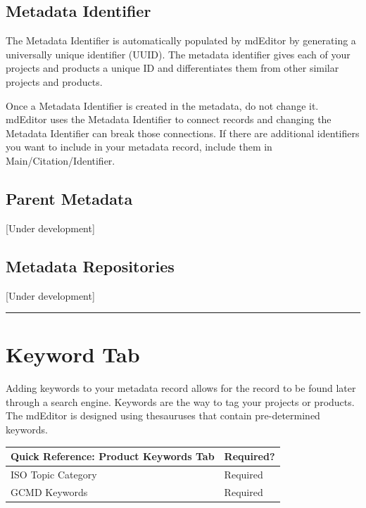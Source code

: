 \documentclass[
]{book}
\makeatletter
\newenvironment{kframe}{%
\medskip{}
\setlength{\fboxsep}{.8em}
 \def\at@end@of@kframe{}%
 \ifinner\ifhmode%
  \def\at@end@of@kframe{\end{minipage}}%
  \begin{minipage}{\columnwidth}%
 \fi\fi%
 \def\FrameCommand##1{\hskip\@totalleftmargin \hskip-\fboxsep
 \colorbox{shadecolor}{##1}\hskip-\fboxsep
     \hskip-\linewidth \hskip-\@totalleftmargin \hskip\columnwidth}%
 \MakeFramed {\advance\hsize-\width
   \@totalleftmargin\z@ \linewidth\hsize
   \@setminipage}}%
 {\par\unskip\endMakeFramed%
 \at@end@of@kframe}
\newenvironment{rmdblock}[1]
  {
  \begin{itemize}
  \renewcommand{\labelitemi}{
    \raisebox{-.7\height}[0pt][0pt]{
      {\setkeys{Gin}{width=3em,keepaspectratio}\texttt{[image: images/\#1]}}
    }
  }
  \setlength{\fboxsep}{1em}
  \begin{kframe}
  \item
  }
  {
  \end{kframe}
  \end{itemize}
  }
\newenvironment{rmdwarning}
  {\begin{rmdblock}{warning}}
  {\end{rmdblock}}
\makeatother
\begin{document}
\hypertarget{metadata-identifier-1}{%
\subsection{Metadata Identifier}\label{metadata-identifier-1}}

The Metadata Identifier is automatically populated by mdEditor by generating a universally unique identifier (UUID). The metadata identifier gives each of your projects and products a unique ID and differentiates them from other similar projects and products.

\begin{rmdwarning}
Once a Metadata Identifier is created in the metadata, do not change it.
mdEditor uses the Metadata Identifier to connect records and changing
the Metadata Identifier can break those connections. If there are
additional identifiers you want to include in your metadata record,
include them in Main/Citation/Identifier.
\end{rmdwarning}

\hypertarget{parent-metadata-1}{%
\subsection{Parent Metadata}\label{parent-metadata-1}}

{[}Under development{]}

\hypertarget{metadata-repositories-1}{%
\subsection{Metadata Repositories}\label{metadata-repositories-1}}

{[}Under development{]}

\begin{center}\rule{0.5\linewidth}{\linethickness}\end{center}

\hypertarget{product-keywords}{%
\section{Keyword Tab}\label{product-keywords}}

Adding keywords to your metadata record allows for the record to be found later through a search engine. Keywords are the way to tag your projects or products. The mdEditor is designed using thesauruses that contain pre-determined keywords.

\begin{longtable}[]{@{}ll@{}}
\toprule
Quick Reference: Product Keywords Tab & Required?\tabularnewline
\midrule
\endhead
ISO Topic Category & Required\tabularnewline
GCMD Keywords & Required\tabularnewline
\bottomrule
\end{longtable}
\end{document}
